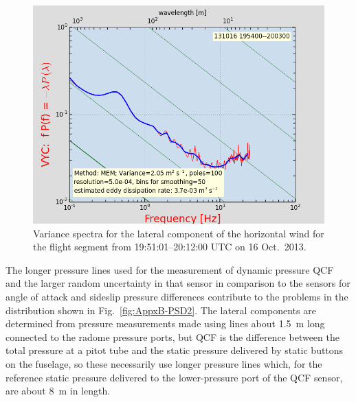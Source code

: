 \documentclass[12pt,twoside,english]{article}\usepackage[]{graphicx}\usepackage[]{color}
\let\OrgIndex\index
\renewcommand*{\index}[1]{\OrgIndex{#1}}
\begin{document}
\begin{figure}
\noindent \begin{centering}
\includegraphics[height=0.4\textheight]{SpecialGraphics/PSD3.png}  
\par\end{centering}

\protect\caption{\label{fig:AppxB-PSD3}Variance spectra for the lateral component of the horizontal wind for the flight segment from 19:51:01--20:12:00 UTC on 16 Oct.\ 2013.} 
\end{figure}


% 
% 


The longer pressure lines used for the measurement of dynamic pressure QCF and the larger random uncertainty in that sensor in comparison to the sensors for angle of attack and sideslip pressure differences contribute to the problems in the distribution shown in Fig.~\ref{fig:AppxB-PSD2}. The lateral components are determined from pressure measurements made using lines about 1.5~m long connected to the radome pressure ports, but QCF is the difference between the total pressure at a pitot tube and the static pressure delivered by static buttons on the fuselage, so these necessarily use longer pressure lines which, for the reference static pressure delivered to the lower-pressure port of the QCF sensor, are about 8~m in length.
\end{document}
